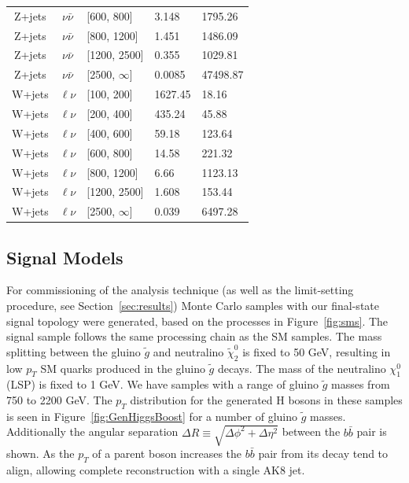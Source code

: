 \begin{table}[hbp!]
\begin{tabular}{cclll}
Z+jets & $\nu\bar{\nu}$ & [600, 800] & 3.148 & 1795.26\\
Z+jets & $\nu\bar{\nu}$ & [800, 1200] & 1.451 & 1486.09\\
Z+jets & $\nu\bar{\nu}$ & [1200, 2500] & 0.355 & 1029.81\\
Z+jets & $\nu\bar{\nu}$ & [2500, $\infty$] & 0.0085 & 47498.87\\
W+jets & $\ell\nu$ & [100, 200] & 1627.45 & 18.16\\
W+jets & $\ell{\nu}$ & [200, 400] & 435.24 & 45.88\\
W+jets & $\ell{\nu}$ & [400, 600] & 59.18 & 123.64\\
W+jets & $\ell{\nu}$ & [600, 800] & 14.58 & 221.32\\
W+jets & $\ell{\nu}$ & [800, 1200] & 6.66 & 1123.13\\
W+jets & $\ell{\nu}$ & [1200, 2500] & 1.608 & 153.44\\
W+jets & $\ell{\nu}$ & [2500, $\infty$] & 0.039 & 6497.28\\
\hline \hline
\end{tabular}
\end{table}

\subsection{Signal Models}
\label{sec:signal-models}

For commissioning of the analysis technique (as well as the limit-setting procedure, see Section~\ref{sec:results}) Monte Carlo samples with our final-state signal topology were generated, based on the processes in Figure~\ref{fig:sms}. The signal sample follows the same processing chain as the SM samples. The mass splitting between the gluino $\tilde{g}$ and neutralino $\tilde{\chi}_{2}^{0}$ is fixed to 50 GeV, resulting in low $p_{T}$ SM quarks produced in the gluino $\tilde{g}$ decays. The mass of the neutralino $\chi^{0}_{1}$ (LSP) is fixed to 1 GeV. We have samples with a range of gluino $\tilde{g}$ masses from 750 to 2200 GeV. The $p_{T}$ distribution for the generated H bosons in these samples is seen in Figure~\ref{fig:GenHiggsBoost} for a number of gluino $\tilde{g}$ masses. Additionally the angular separation $\Delta R \equiv \sqrt{\Delta\phi^{2}+\Delta\eta^{2}}$ between the $b\bar{b}$ pair is shown. As the $p_{T}$ of a parent boson increases the $b\bar{b}$ pair from its decay tend to align, allowing complete reconstruction with a single AK8 jet.


